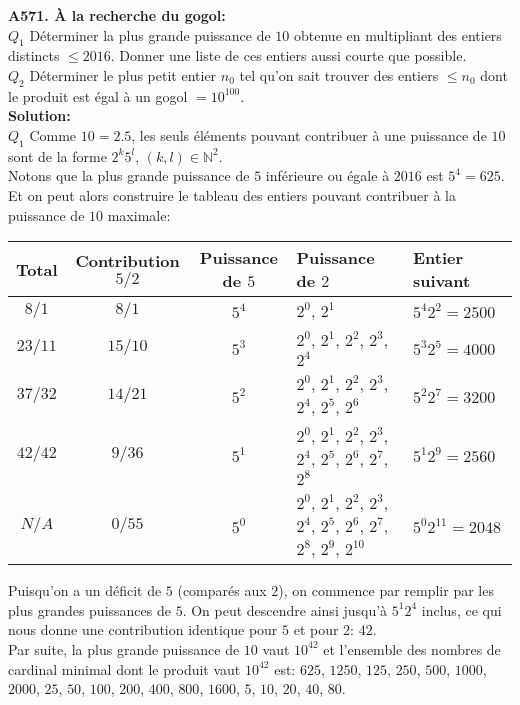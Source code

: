 \documentclass[11pt] {article}
\newcommand{\N} {\mathbb{N}}
\begin{document}



\textbf{A571. À la recherche du gogol:}\\
$Q_{1}$ Déterminer la plus grande puissance de $10$ obtenue en multipliant des entiers distincts $\leq 2016$. Donner une liste de ces entiers aussi courte que possible.\\
$Q_{2}$ Déterminer le plus petit entier $n_{0}$ tel qu'on sait trouver des entiers $\leq n_{0}$ dont le produit est égal à un gogol $= 10^{100}$.\\

\textbf{Solution:}\\
$Q_{1}$ Comme $10 = 2.5$, les seuls éléments pouvant contribuer à une puissance de $10$ sont de la forme $2^{k}5^{l}$, $\left( k,l \right) \in \N^{2}$.\\

Notons que la plus grande puissance de $5$ inférieure ou égale à $2016$ est $5^{4} = 625$. Et on peut alors construire le tableau des entiers pouvant contribuer à la puissance de $10$ maximale:
\begin{center}
	\begin{tabular}{cccll}
		Total & Contribution $5/2$	& Puissance de $5$	& Puissance de $2$	& Entier suivant \\
		\hline
		$8/1$	&	$8/1$	& $5^{4}$	& $2^{0}$, $2^{1}$	& $5^{4}2^{2} = 2500$ \\
		$23/11$	&	$15/10$	& $5^{3}$	& $2^{0}$, $2^{1}$, $2^{2}$, $2^{3}$, $2^{4}$	& $5^{3}2^{5} = 4000$ \\
		$37/32$	&	$14/21$	& $5^{2}$	& $2^{0}$, $2^{1}$, $2^{2}$, $2^{3}$, $2^{4}$, $2^{5}$, $2^{6}$	& $5^{2}2^{7} = 3200$ \\
		$42/42$	&	$9/36$	& $5^{1}$	& $2^{0}$, $2^{1}$, $2^{2}$, $2^{3}$, $2^{4}$, $2^{5}$, $2^{6}$, $2^{7}$, $2^{8}$	& $5^{1}2^{9} = 2560$ \\
		$N/A$	&	$0/55$	& $5^{0}$	& $2^{0}$, $2^{1}$, $2^{2}$, $2^{3}$, $2^{4}$, $2^{5}$, $2^{6}$, $2^{7}$, $2^{8}$, $2^{9}$, $2^{10}$	& $5^{0}2^{11} = 2048$ \\
	\end{tabular}
\end{center}

Puisqu'on a un déficit de $5$ (comparés aux $2$), on commence par remplir par les plus grandes puissances de $5$. On peut descendre ainsi jusqu'à $5^{1}2^{4}$ inclus, ce qui nous donne une contribution identique pour $5$ et pour $2$: $42$.\\
Par suite, la plus grande puissance de $10$ vaut $10^{42}$ et l'ensemble des nombres de cardinal minimal dont le produit vaut $10^{42}$ est: $625$, $1250$, $125$, $250$, $500$, $1000$, $2000$, $25$, $50$, $100$, $200$, $400$, $800$, $1600$, $5$, $10$, $20$, $40$, $80$.\\
\end{document}
